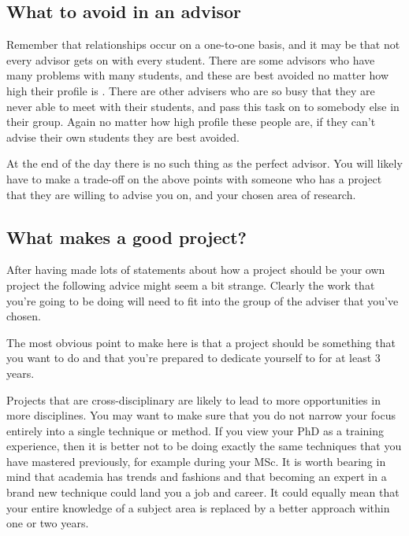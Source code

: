 \documentclass[
]{krantz}
\begin{document}
\hypertarget{what-to-avoid-in-an-advisor}{%
\subsection{What to avoid in an advisor}\label{what-to-avoid-in-an-advisor}}

Remember that relationships occur on a one-to-one basis, and it may be that not every advisor gets on with every student. There are some advisors who have many problems with many students, and these are best avoided no matter how high their profile is \citetext{\citealp[see][]{malaga2004meyer}; \citealp{abbott2004junior}; \citealp[but also see][ for alternative viewpoints]{vences2004meyer}}. There are other advisers who are so busy that they are never able to meet with their students, and pass this task on to somebody else in their group. Again no matter how high profile these people are, if they can't advise their own students they are best avoided.

At the end of the day there is no such thing as the perfect advisor. You will likely have to make a trade-off on the above points with someone who has a project that they are willing to advise you on, and your chosen area of research.

\hypertarget{what-makes-a-good-project}{%
\subsection{What makes a good project?}\label{what-makes-a-good-project}}

After having made lots of statements about how a project should be your own project the following advice might seem a bit strange. Clearly the work that you're going to be doing will need to fit into the group of the adviser that you've chosen.

The most obvious point to make here is that a project should be something that you want to do and that you're prepared to dedicate yourself to for at least 3 years.

Projects that are cross-disciplinary are likely to lead to more opportunities in more disciplines. You may want to make sure that you do not narrow your focus entirely into a single technique or method. If you view your PhD as a training experience, then it is better not to be doing exactly the same techniques that you have mastered previously, for example during your MSc. It is worth bearing in mind that academia has trends and fashions and that becoming an expert in a brand new technique could land you a job and career. It could equally mean that your entire knowledge of a subject area is replaced by a better approach within one or two years.
\end{document}
